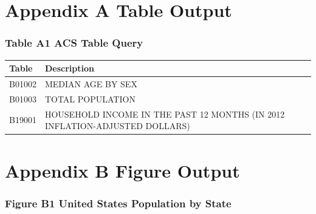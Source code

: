 \documentclass[]{article}
\begin{document}
\newpage

\section{Appendix A Table Output}\label{appendix-a-table-output}

\subsubsection{Table A1 ACS Table Query}\label{table-a1-acs-table-query}

\begin{longtable}[]{@{}ll@{}}
\toprule
\begin{minipage}[b]{0.10\columnwidth}\raggedright\strut
Table
\strut\end{minipage} &
\begin{minipage}[b]{0.84\columnwidth}\raggedright\strut
Description
\strut\end{minipage}\tabularnewline
\midrule
\endhead
\begin{minipage}[t]{0.10\columnwidth}\raggedright\strut
B01002
\strut\end{minipage} &
\begin{minipage}[t]{0.84\columnwidth}\raggedright\strut
MEDIAN AGE BY SEX
\strut\end{minipage}\tabularnewline
\begin{minipage}[t]{0.10\columnwidth}\raggedright\strut
B01003
\strut\end{minipage} &
\begin{minipage}[t]{0.84\columnwidth}\raggedright\strut
TOTAL POPULATION
\strut\end{minipage}\tabularnewline
\begin{minipage}[t]{0.10\columnwidth}\raggedright\strut
B19001
\strut\end{minipage} &
\begin{minipage}[t]{0.84\columnwidth}\raggedright\strut
HOUSEHOLD INCOME IN THE PAST 12 MONTHS (IN 2012 INFLATION-ADJUSTED
DOLLARS)
\strut\end{minipage}\tabularnewline
\bottomrule
\end{longtable}

\newpage

\section{Appendix B Figure Output}\label{appendix-b-figure-output}

\subsubsection{Figure B1 United States Population by
State}\label{figure-b1-united-states-population-by-state}
\end{document}
